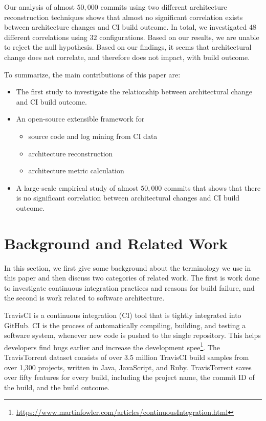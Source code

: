 \documentclass[sigplan, anonymous, review]{acmart}
\begin{document}
Our analysis of almost $50,000$ commits using two different architecture reconstruction techniques shows that almost no significant correlation exists between architecture changes and CI build outcome. In total, we investigated $48$ different correlations using $32$ configurations. Based on our results, we are unable to reject the null hypothesis. Based on our findings, it seems that architectural change does not correlate, and therefore does not impact, with build outcome.

To summarize, the main contributions of this paper are:
\begin{itemize}
\item The first study to investigate the relationship between architectural change and CI build outcome.
\item An open-source extensible framework for 
\begin{itemize}
	\item source code and log mining from CI data
	\item architecture reconstruction
	\item architecture metric calculation
\end{itemize}
\item A large-scale empirical study of almost $50,000$ commits that shows that there is no significant correlation between architectural changes and CI build outcome.
\end{itemize}


\section{Background and Related Work}

In this section, we first give some background about the terminology we use in this paper and then discuss two categories of related work. The first is work done to investigate continuous integration practices and reasons for build failure, and the second is work related to software architecture.

TravisCI is a continuous integration (CI) tool that is tightly integrated into GitHub. CI is the process of automatically compiling, building, and testing a software system, whenever new code is pushed to the single repository. This helps developers find bugs earlier and increase the development spee\footnote{\url{https://www.martinfowler.com/articles/continuousIntegration.html}}. 
The TravisTorrent dataset \cite{TravisTorrent} consists of over 3.5 million TravisCI build samples from over 1,300 projects, written in Java, JavaScript, and Ruby.
TravisTorrent saves over fifty features for every build, including the project name, the commit ID of the build, and the build outcome.
\end{document}
